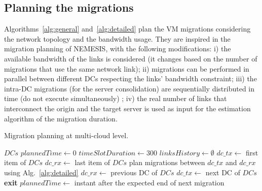 \subsection{Planning the migrations}
\label{sec:planning_migrations}


Algorithms~\ref{alg:general} and~\ref{alg:detailed} plan the VM migrations considering the network topology and the bandwidth usage. They are inspired in the migration planning of NEMESIS, with the following modifications: i) the available bandwidth of the links is considered (it changes based on the number of migrations that use the same network link); ii) migrations can be performed in parallel between different DCs respecting the links' bandwidth constraint; iii) the intra-DC migrations (for the server consolidation) are sequentially distributed in time (do not execute simultaneously) ; iv) the real number of links that interconnect the origin and the target server is used as input for the estimation algorithm of the migration duration.

\begin{algorithm}[h]
\begin{algorithmic}
\caption{Migration planning at multi-cloud level.}\label{alg:general}

\State $DCs$ 
\State $plannedTime \gets 0$
\State $timeSlotDuration \gets 300$
\State $linksHistory \gets \emptyset$
\State $dc\_tx \gets $ first item of $DCs$  %
        \State $dc\_rx \gets $ last item of $DCs$
            \State plan migrations between $dc\_tx$ and $dc\_rx$ using Alg.~\ref{alg:detailed}
            \State $dc\_rx \gets$ previous DC of $DCs$
            \EndWhile
        \EndIf
        \State $dc\_tx \gets$ next DC of $DCs$
    \EndWhile
       \State \textbf{exit}
    \EndIf
    \State $plannedTime \gets$  instant after the expected end of next migration 
\EndWhile
\end{algorithmic}
\end{algorithm}


